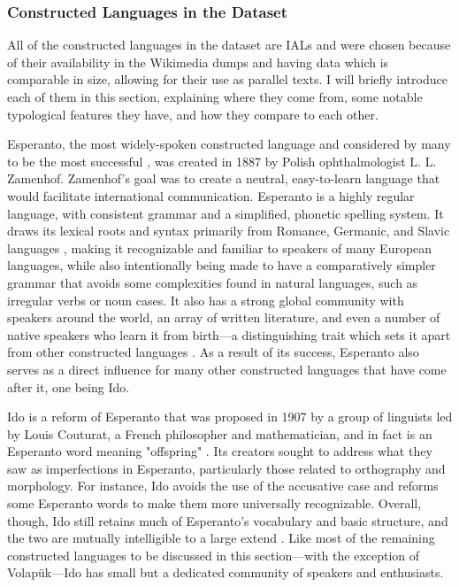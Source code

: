 \documentclass[12pt,a4paper]{article}
\numberwithin{figure}{section}
\numberwithin{table}{section}
\numberwithin{definition}{section}
\begin{document}
\subsubsection{Constructed Languages in the Dataset}
\label{ssec:constructedlanguagesinthedataset}


All of the constructed languages in the dataset are IALs and were chosen because of their availability in the Wikimedia dumps and having data which is comparable in size, allowing for their use as parallel texts. I will briefly introduce each of them in this section, explaining where they come from, some notable typological features they have, and how they compare to each other.

Esperanto, the most widely-spoken constructed language and considered by many to be the most successful \parencite{Gobbo2008article}, was created in 1887 by Polish ophthalmologist L. L. Zamenhof. Zamenhof’s goal was to create a neutral, easy-to-learn language that would facilitate international communication. Esperanto is a highly regular language, with consistent grammar and a simplified, phonetic spelling system. It draws its lexical roots and syntax primarily from Romance, Germanic, and Slavic languages \parencite{Gobbo2008article,Gobbo2011article}, making it recognizable and familiar to speakers of many European languages, while also intentionally being made to have a comparatively simpler grammar that avoids some complexities found in natural languages, such as irregular verbs or noun cases. It also has a strong global community with speakers around the world, an array of written literature, and even a number of native speakers who learn it from birth---a distinguishing trait which sets it apart from other constructed languages \parencite{goodall2022article}. As a result of its success, Esperanto also serves as a direct influence for many other constructed languages that have come after it, one being Ido. 

Ido is a reform of Esperanto that was proposed in 1907 by a group of linguists led by Louis Couturat, a French philosopher and mathematician, and in fact is an Esperanto word meaning "offspring" \parencite{Schubert2001book}. Its creators sought to address what they saw as imperfections in Esperanto, particularly those related to orthography and morphology. For instance, Ido avoids the use of the accusative case and reforms some Esperanto words to make them more universally recognizable. Overall, though, Ido still retains much of Esperanto’s vocabulary and basic structure, and the two are mutually intelligible to a large extend \parencite{goodall2022article,Schubert2001book}. Like most of the remaining constructed languages to be discussed in this section---with the exception of Volapük---Ido has small but a dedicated community of speakers and enthusiasts.
\end{document}
